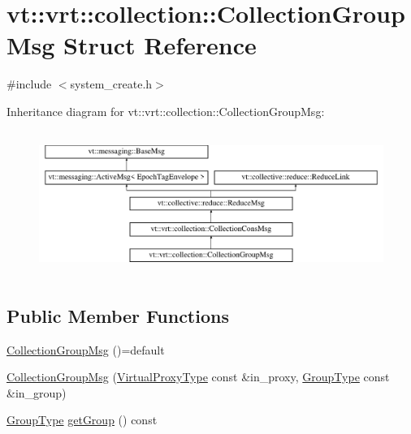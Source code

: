 \hypertarget{structvt_1_1vrt_1_1collection_1_1_collection_group_msg}{}\section{vt\+:\+:vrt\+:\+:collection\+:\+:Collection\+Group\+Msg Struct Reference}
\label{structvt_1_1vrt_1_1collection_1_1_collection_group_msg}


{\ttfamily \#include $<$system\+\_\+create.\+h$>$}

Inheritance diagram for vt\+:\+:vrt\+:\+:collection\+:\+:Collection\+Group\+Msg\+:\begin{figure}[H]
\begin{center}
\leavevmode
\includegraphics[height=4.745763cm]{structvt_1_1vrt_1_1collection_1_1_collection_group_msg}
\end{center}
\end{figure}
\subsection*{Public Member Functions}
\begin{DoxyCompactItemize}
\item 
\hyperlink{structvt_1_1vrt_1_1collection_1_1_collection_group_msg_a3b5c4da131f779c814ede149ec3fbb81}{Collection\+Group\+Msg} ()=default
\item 
\hyperlink{structvt_1_1vrt_1_1collection_1_1_collection_group_msg_abae6c35e09794b3c43c7b6c39f489196}{Collection\+Group\+Msg} (\hyperlink{namespacevt_a1b417dd5d684f045bb58a0ede70045ac}{Virtual\+Proxy\+Type} const \&in\+\_\+proxy, \hyperlink{namespacevt_a27b5e4411c9b6140c49100e050e2f743}{Group\+Type} const \&in\+\_\+group)
\item 
\hyperlink{namespacevt_a27b5e4411c9b6140c49100e050e2f743}{Group\+Type} \hyperlink{structvt_1_1vrt_1_1collection_1_1_collection_group_msg_a109efca9965d4d4353d6b0a317297600}{get\+Group} () const
\end{DoxyCompactItemize}
